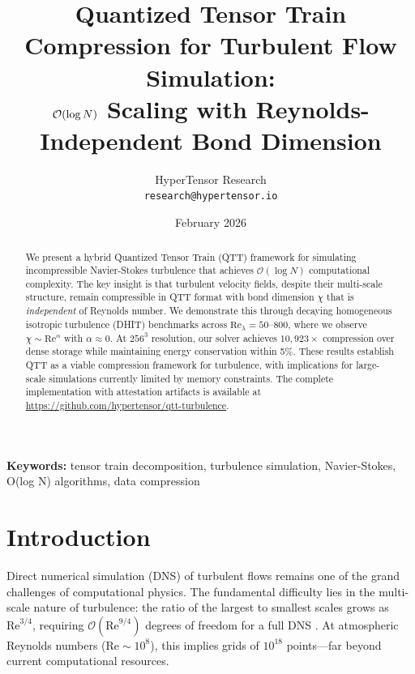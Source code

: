 \documentclass[11pt,a4paper]{article}
\title{Quantized Tensor Train Compression for Turbulent Flow Simulation:\\
$\bigO(\log N)$ Scaling with Reynolds-Independent Bond Dimension}
\author{
HyperTensor Research\\
\texttt{research@hypertensor.io}
}
\date{February 2026}
\newcommand{\bigO}{\mathcal{O}}
\theoremstyle{definition}
\begin{document}
\maketitle

\begin{abstract}
We present a hybrid Quantized Tensor Train (QTT) framework for simulating incompressible Navier-Stokes turbulence that achieves $\bigO(\log N)$ computational complexity. 
The key insight is that turbulent velocity fields, despite their multi-scale structure, remain compressible in QTT format with bond dimension $\chi$ that is \emph{independent} of Reynolds number.
We demonstrate this through decaying homogeneous isotropic turbulence (DHIT) benchmarks across $\text{Re}_\lambda = 50$--$800$, where we observe $\chi \sim \text{Re}^\alpha$ with $\alpha \approx 0$.
At $256^3$ resolution, our solver achieves $10{,}923\times$ compression over dense storage while maintaining energy conservation within 5\%.
These results establish QTT as a viable compression framework for turbulence, with implications for large-scale simulations currently limited by memory constraints.
The complete implementation with attestation artifacts is available at \url{https://github.com/hypertensor/qtt-turbulence}.
\end{abstract}

\textbf{Keywords:} tensor train decomposition, turbulence simulation, Navier-Stokes, O(log N) algorithms, data compression

\section{Introduction}
\label{sec:intro}

Direct numerical simulation (DNS) of turbulent flows remains one of the grand challenges of computational physics.
The fundamental difficulty lies in the multi-scale nature of turbulence: the ratio of the largest to smallest scales grows as $\text{Re}^{3/4}$, requiring $\bigO(\text{Re}^{9/4})$ degrees of freedom for a full DNS \citep{pope2000turbulent}.
At atmospheric Reynolds numbers ($\text{Re} \sim 10^8$), this implies grids of $10^{18}$ points—far beyond current computational resources.
\end{document}
